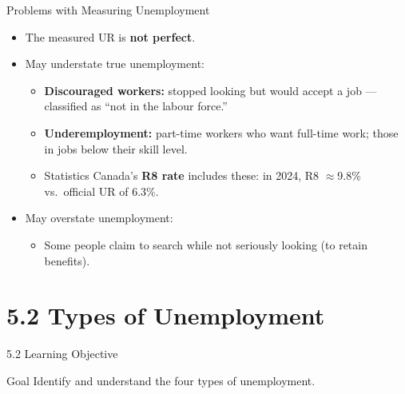 \documentclass[aspectratio=169]{beamer}
\begin{document}
\begin{frame}{Problems with Measuring Unemployment}
\transfade
\begin{itemize}
  \item The measured UR is \textbf{not perfect}.
  \item May \alert{understate} true unemployment:
  \begin{itemize}
    \item \textbf{Discouraged workers:} stopped looking but would accept a job --- classified as ``not in the labour force.''
    \item \textbf{Underemployment:} part-time workers who want full-time work; those in jobs below their skill level.
    \item Statistics Canada's \textbf{R8 rate} includes these: in 2024, R8 $\approx$9.8\% vs.\ official UR of 6.3\%.
  \end{itemize}
  \item May \alert{overstate} unemployment:
  \begin{itemize}
    \item Some people claim to search while not seriously looking (to retain benefits).
  \end{itemize}
\end{itemize}
\end{frame}

\section{5.2 Types of Unemployment}

\begin{frame}{5.2 Learning Objective}
\transfade
\begin{block}{Goal}
Identify and understand the four types of unemployment.
\end{block}
\end{frame}
\end{document}

